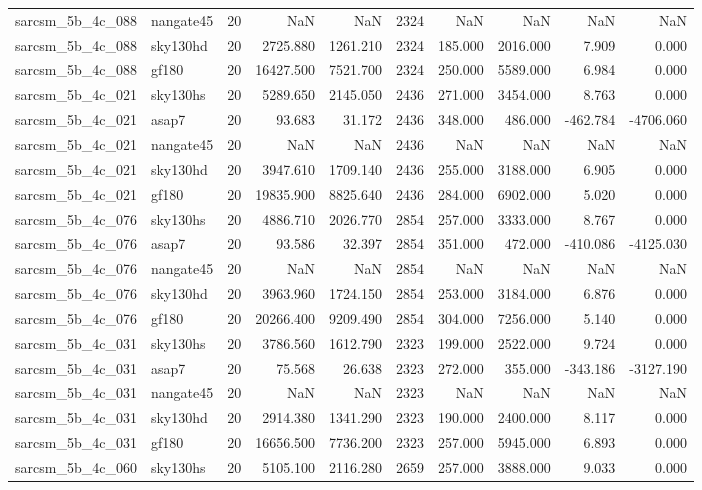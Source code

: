 \begin{tabular}{llrrrrrrrr}
sarcsm\_5b\_4c\_088 & nangate45 & 20 & NaN & NaN & 2324 & NaN & NaN & NaN & NaN \\
sarcsm\_5b\_4c\_088 & sky130hd & 20 & 2725.880 & 1261.210 & 2324 & 185.000 & 2016.000 & 7.909 & 0.000 \\
sarcsm\_5b\_4c\_088 & gf180 & 20 & 16427.500 & 7521.700 & 2324 & 250.000 & 5589.000 & 6.984 & 0.000 \\
sarcsm\_5b\_4c\_021 & sky130hs & 20 & 5289.650 & 2145.050 & 2436 & 271.000 & 3454.000 & 8.763 & 0.000 \\
sarcsm\_5b\_4c\_021 & asap7 & 20 & 93.683 & 31.172 & 2436 & 348.000 & 486.000 & -462.784 & -4706.060 \\
sarcsm\_5b\_4c\_021 & nangate45 & 20 & NaN & NaN & 2436 & NaN & NaN & NaN & NaN \\
sarcsm\_5b\_4c\_021 & sky130hd & 20 & 3947.610 & 1709.140 & 2436 & 255.000 & 3188.000 & 6.905 & 0.000 \\
sarcsm\_5b\_4c\_021 & gf180 & 20 & 19835.900 & 8825.640 & 2436 & 284.000 & 6902.000 & 5.020 & 0.000 \\
sarcsm\_5b\_4c\_076 & sky130hs & 20 & 4886.710 & 2026.770 & 2854 & 257.000 & 3333.000 & 8.767 & 0.000 \\
sarcsm\_5b\_4c\_076 & asap7 & 20 & 93.586 & 32.397 & 2854 & 351.000 & 472.000 & -410.086 & -4125.030 \\
sarcsm\_5b\_4c\_076 & nangate45 & 20 & NaN & NaN & 2854 & NaN & NaN & NaN & NaN \\
sarcsm\_5b\_4c\_076 & sky130hd & 20 & 3963.960 & 1724.150 & 2854 & 253.000 & 3184.000 & 6.876 & 0.000 \\
sarcsm\_5b\_4c\_076 & gf180 & 20 & 20266.400 & 9209.490 & 2854 & 304.000 & 7256.000 & 5.140 & 0.000 \\
sarcsm\_5b\_4c\_031 & sky130hs & 20 & 3786.560 & 1612.790 & 2323 & 199.000 & 2522.000 & 9.724 & 0.000 \\
sarcsm\_5b\_4c\_031 & asap7 & 20 & 75.568 & 26.638 & 2323 & 272.000 & 355.000 & -343.186 & -3127.190 \\
sarcsm\_5b\_4c\_031 & nangate45 & 20 & NaN & NaN & 2323 & NaN & NaN & NaN & NaN \\
sarcsm\_5b\_4c\_031 & sky130hd & 20 & 2914.380 & 1341.290 & 2323 & 190.000 & 2400.000 & 8.117 & 0.000 \\
sarcsm\_5b\_4c\_031 & gf180 & 20 & 16656.500 & 7736.200 & 2323 & 257.000 & 5945.000 & 6.893 & 0.000 \\
sarcsm\_5b\_4c\_060 & sky130hs & 20 & 5105.100 & 2116.280 & 2659 & 257.000 & 3888.000 & 9.033 & 0.000 \\

\end{tabular}
